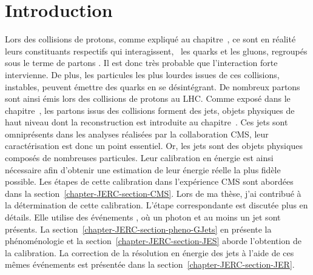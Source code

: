 \section{Introduction}\label{chapter-JERC-section-introduction}
Lors des collisions de protons, comme expliqué au chapitre~,
ce sont en réalité leurs constituants respectifs qui interagissent,
\ie\ les quarks et les gluons, regroupés sous le terme de \og partons \fg.
Il est donc très probable que l'interaction forte intervienne.
De plus, les particules les plus lourdes issues de ces collisions, instables, peuvent émettre des quarks en se désintégrant.
De nombreux partons sont ainsi émis lors des collisions de protons au LHC.
Comme exposé dans le chapitre~, les partons issus des collisions forment des jets, objets physiques de haut niveau dont la reconstruction est introduite au chapitre~.
Ces jets sont omniprésents dans les analyses réalisées par la collaboration CMS,
leur caractérisation est donc un point essentiel.
Or, les jets sont des objets physiques composés de nombreuses particules.
Leur calibration en énergie est ainsi nécessaire afin d'obtenir une estimation de leur énergie réelle la plus fidèle possible.
Les étapes de cette calibration dans l'expérience CMS sont abordées dans la section~\ref{chapter-JERC-section-CMS}.
Lors de ma thèse, j'ai contribué à la détermination de cette calibration.
L'étape correspondante est discutée plus en détails.
Elle utilise des événements \Gjets, où un photon et au moins un jet sont présents.
La section~\ref{chapter-JERC-section-pheno-GJets} en présente la phénoménologie
et
la section~\ref{chapter-JERC-section-JES} aborde l'obtention de la calibration.
La correction de la résolution en énergie des jets à l'aide de ces mêmes événements est présentée dans la section~\ref{chapter-JERC-section-JER}.